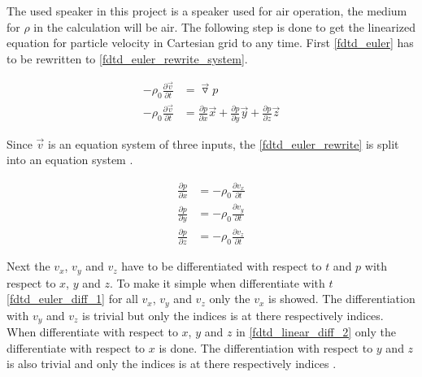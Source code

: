 The used speaker in this project is a speaker used for air operation, the medium for $\rho$ in the calculation will be air. The following step is done to get the linearized equation for particle velocity in Cartesian grid to any time. First \autoref{fdtd_euler} has to be rewritten to \autoref{fdtd_euler_rewrite_system}.


\begin{subequations}\label{fdtd_euler_rewrite}
\begin{alignat}{2}
-\rho_0 \frac{\partial \vec{v}}{\partial t} &=\vec{\triangledown }p \label{fdtd_euler_rewrite_1}\\
-\rho_0 \frac{\partial \vec{v}}{\partial t} &=\frac{\partial p}{\partial x}\vec{x}+\frac{\partial p}{\partial y}\vec{y}+\frac{\partial p}{\partial z}\vec{z} \label{fdtd_euler_rewrite_2}
\end{alignat}
\end{subequations}

Since $\vec{v}$ is an equation system of three inputs, the \autoref{fdtd_euler_rewrite} is split into an equation system \citep{Sakuma2014}.

\begin{subequations}\label{fdtd_euler_rewrite_system}
\begin{alignat}{2}
\frac{\partial p}{\partial x} &=-\rho_0 \frac{\partial v_x}{\partial t} \label{fdtd_euler_rewrite_system_1}\\
\frac{\partial p}{\partial y} &=-\rho_0 \frac{\partial v_y}{\partial t} \label{fdtd_euler_rewrite_system_2}\\
\frac{\partial p}{\partial z} &=-\rho_0 \frac{\partial v_z}{\partial t} \label{fdtd_euler_rewrite_system_3}
\end{alignat}
\end{subequations}


Next the $v_x$, $v_y$ and $v_z$ have to be differentiated with respect to $t$ and $p$ with respect to $x$, $y$ and $z$. To make it simple when differentiate with $t$ \autoref{fdtd_euler_diff_1} for all $v_x$, $v_y$ and $v_z$ only the $v_x$ is showed. The differentiation with $v_y$ and $v_z$ is trivial but only the indices is at there respectively indices. When differentiate with respect to $x$, $y$ and $z$ in \autoref{fdtd_linear_diff_2} only the differentiate with respect to $x$ is done. The differentiation with respect to $y$ and $z$ is also trivial and only the indices is at there respectively indices \citep{Sakuma2014}.



